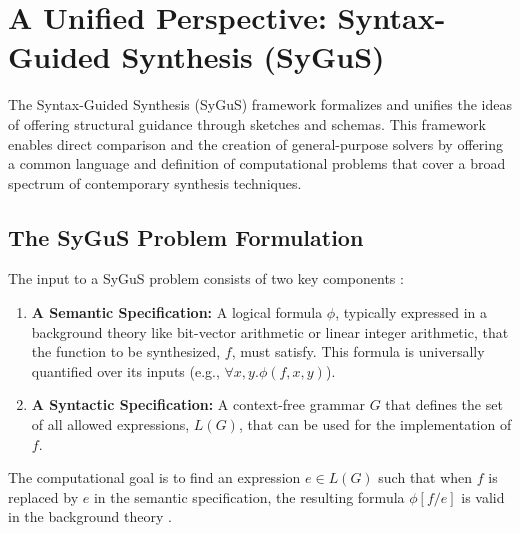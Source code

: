 \documentclass[12pt, a4paper]{report}
\begin{document}
\section{A Unified Perspective: Syntax-Guided Synthesis (SyGuS)}
The Syntax-Guided Synthesis (SyGuS) framework formalizes and unifies the ideas of offering structural guidance through sketches and schemas. This framework enables direct comparison and the creation of general-purpose solvers by offering a common language and definition of computational problems that cover a broad spectrum of contemporary synthesis techniques.

\subsection{The SyGuS Problem Formulation}
The input to a SyGuS problem consists of two key components \citep{alur2013syntax}:
\begin{enumerate}
    \item \textbf{A Semantic Specification:} A logical formula $\phi$, typically expressed in a background theory like bit-vector arithmetic or linear integer arithmetic, that the function to be synthesized, $f$, must satisfy. This formula is universally quantified over its inputs (e.g., $\forall x,y . \phi(f,x,y)$).
    \item \textbf{A Syntactic Specification:} A context-free grammar $G$ that defines the set of all allowed expressions, $L(G)$, that can be used for the implementation of $f$.
\end{enumerate}
The computational goal is to find an expression $e \in L(G)$ such that when $f$ is replaced by $e$ in the semantic specification, the resulting formula $\phi[f/e]$ is valid in the background theory \citep{alur2013syntax}.
\end{document}

